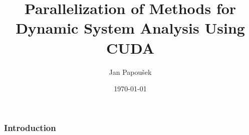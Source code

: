 \documentclass[xcolor=svgnames]{beamer}
\title[Parallelization of Methods for Dynamic System Analysis]{Parallelization of Methods for Dynamic System Analysis Using CUDA}
\author{Jan Papou\v{s}ek}
\institute{Masaryk University Brno}
\date{\today}
\begin{document}
\frame[plain]{\titlepage}
\begin{frame}
	\frametitle{Introduction}
\end{frame}
\end{document}
